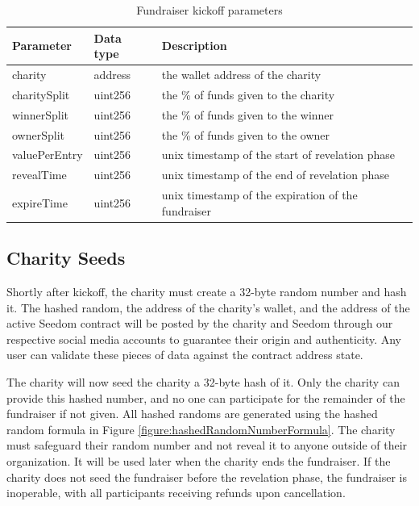 \documentclass[11pt]{article}
\begin{document}
\begin{table}[H]
\begin{center}
\begin{tabular}{| l | l | l |}
\hline
\textbf{Parameter} & \textbf{Data type} & \textbf{Description} \\ \hline
charity & address & the wallet address of the charity \\ \hline
charitySplit & uint256 & the \% of funds given to the charity \\ \hline
winnerSplit & uint256 & the \% of funds given to the winner \\ \hline
ownerSplit & uint256 & the \% of funds given to the owner \\ \hline
valuePerEntry & uint256 & unix timestamp of the start of revelation phase \\ \hline
revealTime & uint256 & unix timestamp of the end of revelation phase \\ \hline
expireTime & uint256 & unix timestamp of the expiration of the fundraiser \\ \hline
\end{tabular}
\caption{Fundraiser kickoff parameters}
\label{tab:fundraiserKickoffParameters}
\end{center}
\end{table}

\subsection{Charity Seeds}
Shortly after kickoff, the charity must create a 32-byte random number and hash it. The hashed random, the address of the charity's wallet, and the address of the active Seedom contract will be posted by the charity and Seedom through our respective social media accounts to guarantee their origin and authenticity. Any user can validate these pieces of data against the contract address state.

The charity will now seed the charity a 32-byte hash of it. Only the charity can provide this hashed number, and no one can participate for the remainder of the fundraiser if not given. All hashed randoms are generated using the hashed random formula in Figure \ref{figure:hashedRandomNumberFormula}. The charity must safeguard their random number and not reveal it to anyone outside of their organization. It will be used later when the charity ends the fundraiser. If the charity does not seed the fundraiser before the revelation phase, the fundraiser is inoperable, with all participants receiving refunds upon cancellation.
\end{document}
